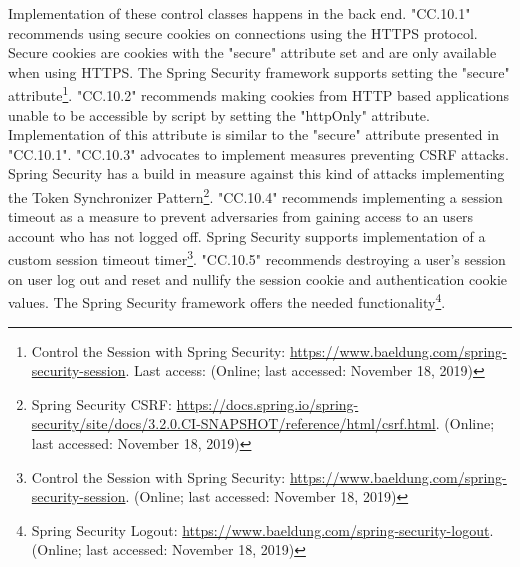 Implementation of these control classes happens in the back end. "CC.10.1" recommends using secure cookies on connections using the HTTPS protocol. Secure cookies are cookies with the "secure" attribute set and are only available when using HTTPS. The Spring Security framework supports setting the "secure" attribute\footnote{Control the Session with Spring Security: \url{https://www.baeldung.com/spring-security-session}. Last access: (Online; last accessed:  November 18, 2019)}. "CC.10.2" recommends making cookies from HTTP based applications unable to be accessible by script by setting the "httpOnly" attribute. Implementation of this attribute is similar to the "secure" attribute presented in "CC.10.1". "CC.10.3" advocates to implement measures preventing CSRF attacks. Spring Security has a build in measure against this kind of attacks implementing the Token Synchronizer Pattern\footnote{Spring Security CSRF: \url{https://docs.spring.io/spring-security/site/docs/3.2.0.CI-SNAPSHOT/reference/html/csrf.html}. (Online; last accessed:  November 18, 2019)}. "CC.10.4" recommends implementing a session timeout as a measure to prevent adversaries from gaining access to an users account who has not logged off. Spring Security supports implementation of a custom session timeout timer\footnote{Control the Session with Spring Security: \url{https://www.baeldung.com/spring-security-session}. (Online; last accessed:  November 18, 2019)}. "CC.10.5" recommends destroying a user's session on user log out and reset and nullify the session cookie and authentication cookie values. The Spring Security framework offers the needed functionality\footnote{Spring Security Logout: \url{https://www.baeldung.com/spring-security-logout}. (Online; last accessed:  November 18, 2019)}.\\





